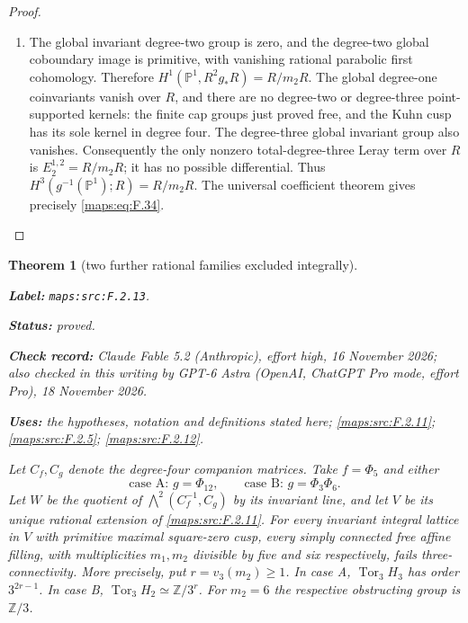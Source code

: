 \documentclass[11pt,a4paper]{article}
\newtheorem{theorem}{Theorem}[section]
\theoremstyle{definition}
\newcommand{\StatementRecord}[4]{\par\smallskip\begingroup\upshape\raggedright\noindent\textbf{Label:} \nolinkurl{#1}.\par\noindent\textbf{Status:} #2.\par\noindent\textbf{Check record:} #3.\par\noindent\textbf{Uses:} #4.\par\endgroup\smallskip}
\newcommand{\CurrentChecker}{GPT-6 Astra (OpenAI, ChatGPT Pro mode, effort Pro), 18 November 2026}
\begin{document}
\begin{proof}
\begin{enumerate}[label=\arabic*.]
\item The global invariant degree-two group is zero, and the
degree-two global coboundary image is primitive, with
vanishing rational parabolic first cohomology.  Therefore
$H^1(\mathbb P^1,R^2g_*R)=R/m_2R$.
The global degree-one coinvariants vanish over $R$, and
there are no degree-two or degree-three point-supported
kernels: the finite cap groups just proved free, and the
Kuhn cusp has its sole kernel in degree four.
The degree-three global invariant group also vanishes.
Consequently the only nonzero total-degree-three Leray
term over $R$ is $E_2^{1,2}=R/m_2R$; it has no possible
differential.  Thus $H^3(g^{-1}(\mathbb P^1);R)=R/m_2R$.
The universal coefficient theorem gives precisely \eqref{maps:eq:F.34}.

\end{enumerate}
\end{proof}




\begin{theorem}[two further rational families excluded integrally]\label{maps:src:F.2.13}
\StatementRecord{maps:src:F.2.13}{proved}{Claude Fable 5.2 (Anthropic), effort high, 16 November 2026; also checked in this writing by \CurrentChecker}{the hypotheses, notation and definitions stated here; \cref{maps:src:F.2.11}; \cref{maps:src:F.2.5}; \cref{maps:src:F.2.12}}


Let $C_f,C_g$ denote the degree-four companion matrices.
Take $f=\Phi_5$ and either
\[
 \text{case A: }g=\Phi_{12},\qquad
 \text{case B: }g=\Phi_3\Phi_6.
 \tag{F.36}\label{maps:eq:F.36}
\]
Let $W$ be the quotient of
$\bigwedge^2(C_f^{-1},C_g)$ by its invariant line, and
let $V$ be its unique rational extension of \ref{maps:src:F.2.11}.
For every invariant integral lattice in $V$ with primitive
maximal square-zero cusp, every simply connected free affine
filling, with multiplicities $m_1,m_2$ divisible by five and
six respectively, fails three-connectivity.
More precisely, put $r=v_3(m_2)\geq1$.
In case A, $\operatorname{Tor}_3 H_3$ has order
$3^{2r-1}$.  In case B,
$\operatorname{Tor}_3 H_2\simeq\mathbb Z/3^r$.
For $m_2=6$ the respective obstructing group is $\mathbb Z/3$.

\end{theorem}
\end{document}

